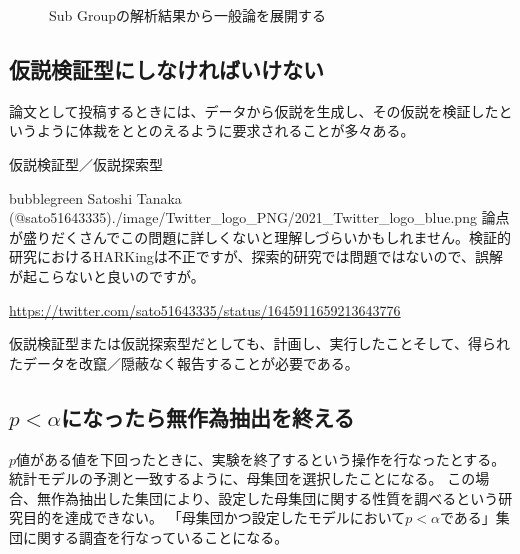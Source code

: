 
\begin{figure}
 \begin{center}
  \caption{Sub Groupの解析結果から一般論を展開する}
  \label{fig:conceptual_diagram_HARKing}
 \end{center}
\end{figure}


\subsection{仮説検証型にしなければいけない}
論文として投稿するときには、データから仮説を生成し、その仮説を検証したというように体裁をととのえるように要求されることが多々ある。

\begin{SMbox}{仮説検証型／仮説探索型}

\begin{rightbubbles}{bubblegreen}{
 Satoshi Tanaka (@sato51643335)}{./image/Twitter_logo_PNG/2021_Twitter_logo_blue.png}
 論点が盛りだくさんでこの問題に詳しくないと理解しづらいかもしれません。検証的研究におけるHARKingは不正ですが、探索的研究では問題ではないので、誤解が起こらないと良いのですが。
 \begin{flushright}
  \small	\url{https://twitter.com/sato51643335/status/1645911659213643776}
 \end{flushright}
\end{rightbubbles}

仮説検証型または仮説探索型だとしても、計画し、実行したことそして、得られたデータを改竄／隠蔽なく報告することが必要である。

\end{SMbox}



\subsection{$p<\alpha$になったら無作為抽出を終える}
$p$値がある値を下回ったときに、実験を終了するという操作を行なったとする。
統計モデルの予測と一致するように、母集団を選択したことになる。
この場合、無作為抽出した集団により、設定した母集団に関する性質を調べるという研究目的を達成できない。
「母集団かつ設定したモデルにおいて$p<\alpha$である」集団に関する調査を行なっていることになる。

